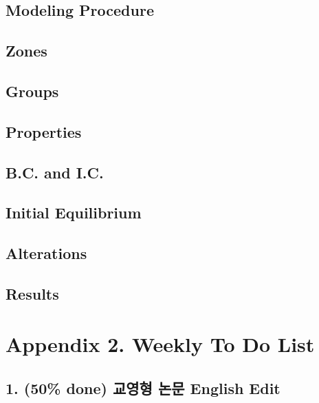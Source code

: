 \documentclass[a4paper, nobind]{templates/ociamthesis}
\begin{document}
\hypertarget{modeling-procedure-2}{%
\section{Modeling Procedure}\label{modeling-procedure-2}}

\hypertarget{zones-4}{%
\section{Zones}\label{zones-4}}

\hypertarget{groups-3}{%
\section{Groups}\label{groups-3}}

\hypertarget{properties-3}{%
\section{Properties}\label{properties-3}}

\hypertarget{b.c.-and-i.c.-2}{%
\section{B.C. and I.C.}\label{b.c.-and-i.c.-2}}

\hypertarget{initial-equilibrium-2}{%
\section{Initial Equilibrium}\label{initial-equilibrium-2}}

\hypertarget{alterations-2}{%
\section{Alterations}\label{alterations-2}}

\hypertarget{results-2}{%
\section{Results}\label{results-2}}

\hypertarget{appendix-2.-weekly-to-do-list}{%
\chapter{Appendix 2. Weekly To Do List}\label{appendix-2.-weekly-to-do-list}}

\hypertarget{done-uxad50uxc601uxd615-uxb17cuxbb38-english-edit}{%
\section{1. (50\% done) 교영형 논문 English Edit}\label{done-uxad50uxc601uxd615-uxb17cuxbb38-english-edit}}
\end{document}
